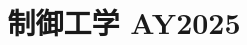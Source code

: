 \documentclass[11pt,a4paper]{article}
\title{制御工学 AY2025}
\author{}
\date{}
\begin{document}
\maketitle


\bigskip

\end{document}
